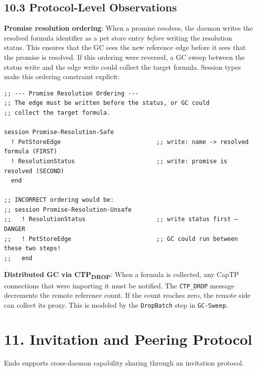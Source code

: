 \documentclass[11pt]{article}
\begin{document}
\subsection{10.3 Protocol-Level Observations}
\label{sec:org53289c7}

\textbf{Promise resolution ordering}: When a promise resolves, the daemon writes
the resolved formula identifier as a pet store entry \emph{before} writing the
resolution status. This ensures that the GC sees the new reference edge
before it sees that the promise is resolved. If this ordering were reversed,
a GC sweep between the status write and the edge write could collect the
target formula. Session types make this ordering constraint explicit:

\begin{verbatim}
;; --- Promise Resolution Ordering ---
;; The edge must be written before the status, or GC could
;; collect the target formula.

session Promise-Resolution-Safe
  ! PetStoreEdge                           ;; write: name -> resolved formula (FIRST)
  ! ResolutionStatus                       ;; write: promise is resolved (SECOND)
  end

;; INCORRECT ordering would be:
;; session Promise-Resolution-Unsafe
;;   ! ResolutionStatus                    ;; write status first — DANGER
;;   ! PetStoreEdge                        ;; GC could run between these two steps!
;;   end
\end{verbatim}

\textbf{Distributed GC via CTP\textsubscript{DROP}}: When a formula is collected, any CapTP
connections that were importing it must be notified. The \texttt{CTP\_DROP} message
decrements the remote reference count. If the count reaches zero, the remote
side can collect its proxy. This is modeled by the \texttt{DropBatch} step in
\texttt{GC-Sweep}.
\section{11. Invitation and Peering Protocol}
\label{sec:orgbf6379f}

Endo supports cross-daemon capability sharing through an invitation
protocol.
\end{document}
